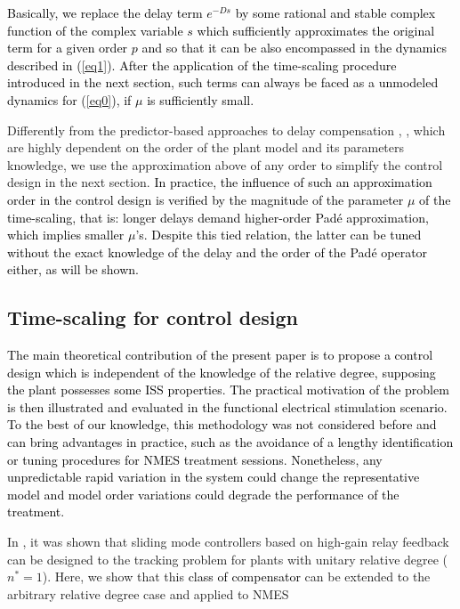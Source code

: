 \documentclass[review]{elsarticle}
\begin{document}
\textcolor{black}{Basically, we replace the delay term $e^{-Ds}$ by some rational and stable complex function of the complex variable $s$ which sufficiently approximates the original term for a given order $p$ and so that it can be also encompassed in the dynamics described in
(\ref{eq1}). After the application of the time-scaling procedure introduced in the next section, such terms can always be faced as a unmodeled dynamics for (\ref{eq0}),  if $\mu$ is sufficiently small.}

Differently from the predictor-based approaches to delay compensation \cite{SGD:2011}, \cite{KMQKY:2014}, which are highly dependent
on the order of the plant model and its parameters knowledge, we use the approximation above of any order to simplify the control design in the next section. \textcolor{black}{In practice, the influence of such an approximation order in the control design is verified by the magnitude of the parameter $\mu$ of the time-scaling, that is: longer delays demand higher-order Pad\'e approximation, \textcolor{black}{which implies} smaller $\mu$'s. \textcolor{black}{Despite this} tied relation, the latter can be tuned without the exact knowledge of the delay and the order of the Pad\'e operator either, as will be shown.}



\subsection{Time-scaling for control design}
\label{coco}

\textcolor{black}{The main theoretical contribution of the present paper is to propose a control design which is independent of the knowledge of the relative degree, supposing the plant possesses some ISS properties. The practical motivation of the problem is then illustrated and evaluated in the functional electrical stimulation scenario. To the best of our knowledge, this methodology was not considered before and can bring advantages in practice, such as the avoidance of a lengthy identification or tuning procedures for NMES treatment sessions.
\textcolor{black}{Nonetheless,} any unpredictable rapid variation in the system could change the representative model and model order variations could degrade the performance of the treatment.}


In \cite{UGS:99}, it was shown that sliding mode controllers based on high-gain relay feedback can be designed to the tracking problem for plants with unitary relative degree ($n^*=1$). Here, we show that this \textcolor{black}{class of compensator} can be extended to the arbitrary relative degree case and applied to NMES  
\end{document}
